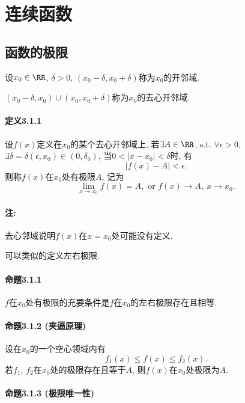 \section{连续函数}
\subsection{函数的极限}

设$x_{0}\in\RR$, $\delta>0$, $\left(x_{0}-\delta,x_{0}+\delta\right)$称为$x_{0}$的开邻域.

$\left(x_{0}-\delta,x_{0}\right)\cup\left(x_{0},x_{0}+\delta\right)$称为$x_{0}$的去心开邻域.

\paragraph{定义3.1.1}

设$f(x)$定义在$x_{0}$的某个去心开邻域上, 若$\exists A\in\RR$, s.t. $\forall\epsilon>0$,
$\exists\delta=\delta(\epsilon,x_{0})\in(0,\delta_{0})$, 当$0<\left|x-x_{0}\right|<\delta$时,
有
\[
\left|f(x)-A\right|<\epsilon.
\]
则称$f(x)$在$x_{0}$处有极限$A$, 记为
\[
\lim_{x\to x_{0}}f(x)=A,\text{ or }f(x)\to A,\ x\to x_{0}.
\]


\paragraph{注: }

去心邻域说明$f(x)$在$x=x_{0}$处可能没有定义.

可以类似的定义左右极限.

\paragraph{命题3.1.1}

$f$在$x_{0}$处有极限的充要条件是$f$在$x_{0}$的左右极限存在且相等.

\paragraph{命题3.1.2 (夹逼原理)}

设在$x_{0}$的一个空心领域内有
\[
f_{1}(x)\le f(x)\le f_{2}(x).
\]
若$f_{1}$, $f_{2}$在$x_{0}$处的极限存在且等于$A$, 则$f(x)$在$x_{0}$处极限为$A$.

\paragraph{命题3.1.3 (极限唯一性)}

